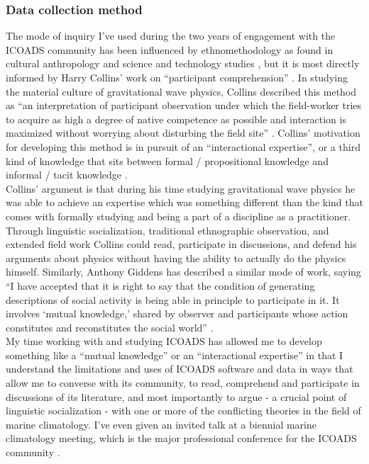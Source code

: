 \documentclass[thesis,tocnosub,noragright,centerchapter,12pt]{uiucecethesis09}
\begin{document}
{\subsubsection*{Data collection method}

The mode of inquiry I've used during the two years of engagement with
the ICOADS community has been influenced by ethnomethodology as found in
cultural anthropology \citep[e.g.][]{garfinkel1967studies} and science and technology
studies \citep[e.g.][]{lynch1997ethnomethodology}, but it is most directly informed by Harry
Collins' work on ``participant comprehension'' \citeyearpar{collins1987expert}. In studying the
material culture of gravitational wave physics, Collins described this
method as ``an interpretation of participant observation under which the
field-worker tries to acquire as high a degree of native competence as
possible and interaction is maximized without worrying about disturbing
the field site'' \citeyearpar[p. 297]{collins1998meaning}. Collins' motivation for developing this method is
in pursuit of an ``interactional expertise'', or a third kind of
knowledge that sits between formal / propositional knowledge and
informal / tacit knowledge \citeyearpar[p. 125-7]{collins2004interactional}.\\

Collins' argument is that
during his time studying gravitational wave physics he was able to
achieve an expertise which was something different than the kind that
comes with formally studying and being a part of a discipline as a
practitioner. Through linguistic socialization, traditional
ethnographic observation, and extended field work Collins could read,
participate in discussions, and defend his arguments about physics
without having the ability to actually do the physics himself.
Similarly, Anthony Giddens has described a similar mode of work, saying
``I have accepted that it is right to say that the condition of
generating descriptions of social activity is being able in principle to
participate in it. It involves `mutual knowledge,' shared by observer
and participants whose action constitutes and reconstitutes the social
world'' \citep[p. 15]{giddens1982profiles}.\\

My time working with and
studying ICOADS has allowed me to develop something like a ``mutual
knowledge'' or an ``interactional expertise'' in that I understand the
limitations and uses of ICOADS software and data in ways that allow me
to converse with its community, to read, comprehend and participate in
discussions of its literature, and most importantly to argue - a crucial
point of linguistic socialization \citep{collins1998meaning}- with one or more of
the conflicting theories in the field of marine climatology. I've even
given an invited talk at a biennial marine climatology meeting, which is
the major professional conference for the ICOADS community \citep{weber2014coop}.\\ 

}
\end{document}

